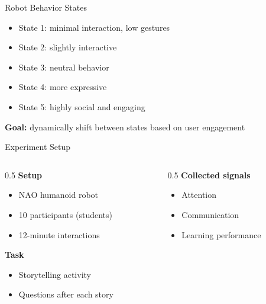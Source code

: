 \documentclass[aspectratio=169,10pt]{beamer}
\begin{document}

\begin{frame}{Robot Behavior States}
\footnotesize

\begin{itemize}\footnotesize
    \item State 1: minimal interaction, low gestures
    \item State 2: slightly interactive
    \item State 3: neutral behavior
    \item State 4: more expressive
    \item State 5: highly social and engaging
\end{itemize}

\vspace{0.5em}

\textbf{Goal:} dynamically shift between states based on user engagement

\end{frame}


\begin{frame}{Experiment Setup}
\footnotesize

\begin{columns}[T]

\begin{column}{0.5\textwidth}
\textbf{Setup}
\begin{itemize}\footnotesize
    \item NAO humanoid robot
    \item 10 participants (students)
    \item 12-minute interactions
\end{itemize}

\textbf{Task}
\begin{itemize}\footnotesize
    \item Storytelling activity
    \item Questions after each story
\end{itemize}
\end{column}

\begin{column}{0.5\textwidth}
\textbf{Collected signals}
\begin{itemize}\footnotesize
    \item Attention
    \item Communication
    \item Learning performance
\end{itemize}
\end{column}

\end{columns}

\end{frame}
\end{document}
